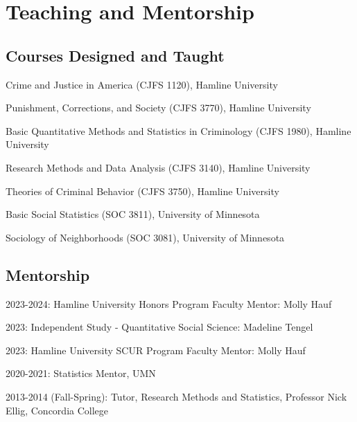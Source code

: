 \documentclass[letterpaper]{article}
\renewenvironment{itemize}{
  \begin{list}{}{
    \setlength{\leftmargin}{1.5em}
  }
}{
  \end{list}
}
\begin{document}
\section*{\textbf{Teaching and Mentorship}}

\subsection*{Courses Designed and Taught}


\begin{itemize} 

\item Crime and Justice in America (CJFS 1120), Hamline University
\item Punishment, Corrections, and Society (CJFS 3770), Hamline University
\item Basic Quantitative Methods and Statistics in Criminology (CJFS 1980), Hamline University
\item Research Methods and Data Analysis (CJFS 3140), Hamline University
\item Theories of Criminal Behavior (CJFS 3750), Hamline University
\item Basic Social Statistics (SOC 3811), University of Minnesota
\item Sociology of Neighborhoods (SOC 3081), University of Minnesota

\end{itemize}


\subsection*{Mentorship}
        \begin{itemize}

\item 2023-2024: Hamline University Honors Program Faculty Mentor: Molly Hauf
\item 2023: Independent Study - Quantitative Social Science: Madeline Tengel 
\item 2023: Hamline University SCUR Program Faculty Mentor: Molly Hauf
\item 2020-2021: Statistics Mentor, UMN
\item 2013-2014 (Fall-Spring): Tutor, Research Methods and Statistics, Professor Nick Ellig, Concordia College
         \end{itemize}
\end{document}
